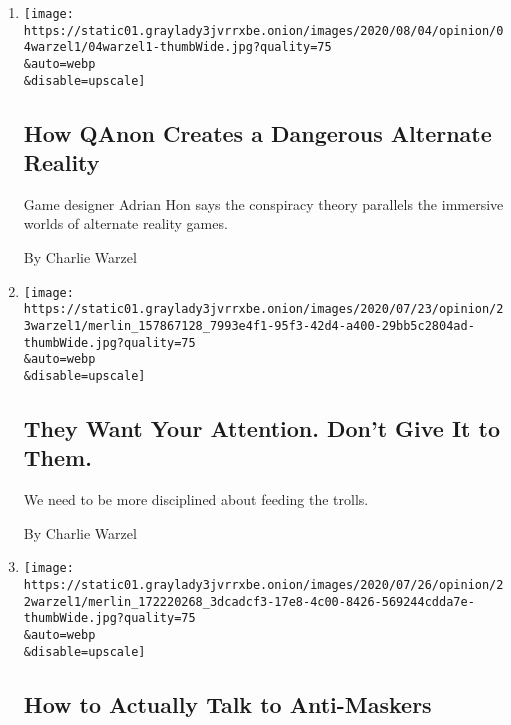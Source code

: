 \begin{enumerate}
\def\labelenumi{\arabic{enumi}.}
\item
  \href{/2020/08/04/opinion/qanon-conspiracy-theory-arg.html}{}

  \texttt{[image: https://static01.graylady3jvrrxbe.onion/images/2020/08/04/opinion/04warzel1/04warzel1-thumbWide.jpg?quality=75\\\&auto=webp\\\&disable=upscale]}

  \hypertarget{how-qanon-creates-a-dangerous-alternate-reality}{%
  \subsection{How QAnon Creates a Dangerous Alternate
  Reality}\label{how-qanon-creates-a-dangerous-alternate-reality}}

  Game designer Adrian Hon says the conspiracy theory parallels the
  immersive worlds of alternate reality games.

  By Charlie Warzel
\item
  \href{/2020/07/23/opinion/cancel-culture.html}{}

  \texttt{[image: https://static01.graylady3jvrrxbe.onion/images/2020/07/23/opinion/23warzel1/merlin\_157867128\_7993e4f1-95f3-42d4-a400-29bb5c2804ad-thumbWide.jpg?quality=75\\\&auto=webp\\\&disable=upscale]}

  \hypertarget{they-want-your-attention-dont-give-it-to-them}{%
  \subsection{They Want Your Attention. Don't Give It to
  Them.}\label{they-want-your-attention-dont-give-it-to-them}}

  We need to be more disciplined about feeding the trolls.

  By Charlie Warzel
\item
  \href{/2020/07/22/opinion/coronavirus-health-experts.html}{}

  \texttt{[image: https://static01.graylady3jvrrxbe.onion/images/2020/07/26/opinion/22warzel1/merlin\_172220268\_3dcadcf3-17e8-4c00-8426-569244cdda7e-thumbWide.jpg?quality=75\\\&auto=webp\\\&disable=upscale]}

  \hypertarget{how-to-actually-talk-to-anti-maskers}{%
  \subsection{How to Actually Talk to
  Anti-Maskers}\label{how-to-actually-talk-to-anti-maskers}}


\end{enumerate}
